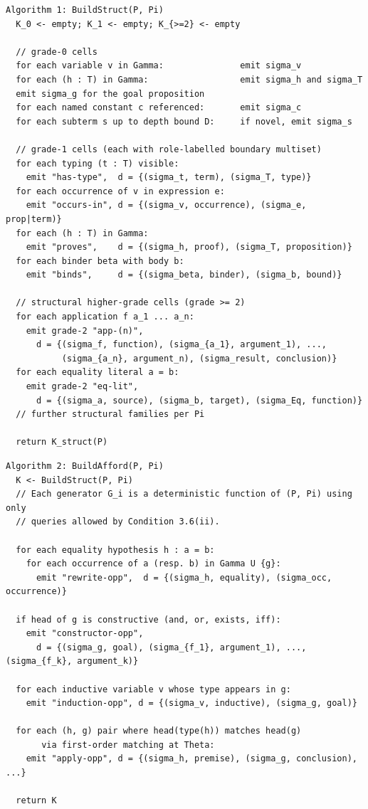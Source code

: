 \documentclass[11pt]{article}
\theoremstyle{definition}
\theoremstyle{plain}
\begin{document}
\begin{small}
\begin{verbatim}
Algorithm 1: BuildStruct(P, Pi)
  K_0 <- empty; K_1 <- empty; K_{>=2} <- empty

  // grade-0 cells
  for each variable v in Gamma:               emit sigma_v
  for each (h : T) in Gamma:                  emit sigma_h and sigma_T
  emit sigma_g for the goal proposition
  for each named constant c referenced:       emit sigma_c
  for each subterm s up to depth bound D:     if novel, emit sigma_s

  // grade-1 cells (each with role-labelled boundary multiset)
  for each typing (t : T) visible:
    emit "has-type",  d = {(sigma_t, term), (sigma_T, type)}
  for each occurrence of v in expression e:
    emit "occurs-in", d = {(sigma_v, occurrence), (sigma_e, prop|term)}
  for each (h : T) in Gamma:
    emit "proves",    d = {(sigma_h, proof), (sigma_T, proposition)}
  for each binder beta with body b:
    emit "binds",     d = {(sigma_beta, binder), (sigma_b, bound)}

  // structural higher-grade cells (grade >= 2)
  for each application f a_1 ... a_n:
    emit grade-2 "app-(n)",
      d = {(sigma_f, function), (sigma_{a_1}, argument_1), ...,
           (sigma_{a_n}, argument_n), (sigma_result, conclusion)}
  for each equality literal a = b:
    emit grade-2 "eq-lit",
      d = {(sigma_a, source), (sigma_b, target), (sigma_Eq, function)}
  // further structural families per Pi

  return K_struct(P)
\end{verbatim}
\end{small}

\begin{small}
\begin{verbatim}
Algorithm 2: BuildAfford(P, Pi)
  K <- BuildStruct(P, Pi)
  // Each generator G_i is a deterministic function of (P, Pi) using only
  // queries allowed by Condition 3.6(ii).

  for each equality hypothesis h : a = b:
    for each occurrence of a (resp. b) in Gamma U {g}:
      emit "rewrite-opp",  d = {(sigma_h, equality), (sigma_occ, occurrence)}

  if head of g is constructive (and, or, exists, iff):
    emit "constructor-opp",
      d = {(sigma_g, goal), (sigma_{f_1}, argument_1), ..., (sigma_{f_k}, argument_k)}

  for each inductive variable v whose type appears in g:
    emit "induction-opp", d = {(sigma_v, inductive), (sigma_g, goal)}

  for each (h, g) pair where head(type(h)) matches head(g)
       via first-order matching at Theta:
    emit "apply-opp", d = {(sigma_h, premise), (sigma_g, conclusion), ...}

  return K
\end{verbatim}
\end{small}
\end{document}
